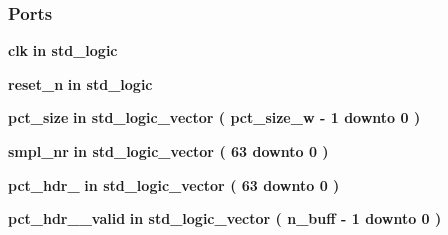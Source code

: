 \subsubsection*{Ports}
 \begin{DoxyCompactItemize}
\item 
{\bf clk}  {\bfseries {\bfseries \textcolor{keywordflow}{in}\textcolor{vhdlchar}{ }}} {\bfseries \textcolor{comment}{std\+\_\+logic}\textcolor{vhdlchar}{ }} 
\item 
{\bf reset\+\_\+n}  {\bfseries {\bfseries \textcolor{keywordflow}{in}\textcolor{vhdlchar}{ }}} {\bfseries \textcolor{comment}{std\+\_\+logic}\textcolor{vhdlchar}{ }} 
\item 
{\bf pct\+\_\+size}  {\bfseries {\bfseries \textcolor{keywordflow}{in}\textcolor{vhdlchar}{ }}} {\bfseries \textcolor{comment}{std\+\_\+logic\+\_\+vector}\textcolor{vhdlchar}{ }\textcolor{vhdlchar}{(}\textcolor{vhdlchar}{ }\textcolor{vhdlchar}{ }\textcolor{vhdlchar}{ }\textcolor{vhdlchar}{ }{\bfseries {\bf pct\+\_\+size\+\_\+w}} \textcolor{vhdlchar}{-\/}\textcolor{vhdlchar}{ } \textcolor{vhdldigit}{1} \textcolor{vhdlchar}{ }\textcolor{keywordflow}{downto}\textcolor{vhdlchar}{ }\textcolor{vhdlchar}{ } \textcolor{vhdldigit}{0} \textcolor{vhdlchar}{ }\textcolor{vhdlchar}{)}\textcolor{vhdlchar}{ }} 
\item 
{\bf smpl\+\_\+nr}  {\bfseries {\bfseries \textcolor{keywordflow}{in}\textcolor{vhdlchar}{ }}} {\bfseries \textcolor{comment}{std\+\_\+logic\+\_\+vector}\textcolor{vhdlchar}{ }\textcolor{vhdlchar}{(}\textcolor{vhdlchar}{ }\textcolor{vhdlchar}{ } \textcolor{vhdldigit}{63} \textcolor{vhdlchar}{ }\textcolor{keywordflow}{downto}\textcolor{vhdlchar}{ }\textcolor{vhdlchar}{ } \textcolor{vhdldigit}{0} \textcolor{vhdlchar}{ }\textcolor{vhdlchar}{)}\textcolor{vhdlchar}{ }} 
\item 
{\bf pct\+\_\+hdr\+\_}  {\bfseries {\bfseries \textcolor{keywordflow}{in}\textcolor{vhdlchar}{ }}} {\bfseries \textcolor{comment}{std\+\_\+logic\+\_\+vector}\textcolor{vhdlchar}{ }\textcolor{vhdlchar}{(}\textcolor{vhdlchar}{ }\textcolor{vhdlchar}{ } \textcolor{vhdldigit}{63} \textcolor{vhdlchar}{ }\textcolor{keywordflow}{downto}\textcolor{vhdlchar}{ }\textcolor{vhdlchar}{ } \textcolor{vhdldigit}{0} \textcolor{vhdlchar}{ }\textcolor{vhdlchar}{)}\textcolor{vhdlchar}{ }} 
\item 
{\bf pct\+\_\+hdr\+\_\+\_\+valid}  {\bfseries {\bfseries \textcolor{keywordflow}{in}\textcolor{vhdlchar}{ }}} {\bfseries \textcolor{comment}{std\+\_\+logic\+\_\+vector}\textcolor{vhdlchar}{ }\textcolor{vhdlchar}{(}\textcolor{vhdlchar}{ }\textcolor{vhdlchar}{ }\textcolor{vhdlchar}{ }\textcolor{vhdlchar}{ }{\bfseries {\bf n\+\_\+buff}} \textcolor{vhdlchar}{-\/}\textcolor{vhdlchar}{ } \textcolor{vhdldigit}{1} \textcolor{vhdlchar}{ }\textcolor{keywordflow}{downto}\textcolor{vhdlchar}{ }\textcolor{vhdlchar}{ } \textcolor{vhdldigit}{0} \textcolor{vhdlchar}{ }\textcolor{vhdlchar}{)}\textcolor{vhdlchar}{ }} 

\end{DoxyCompactItemize}
